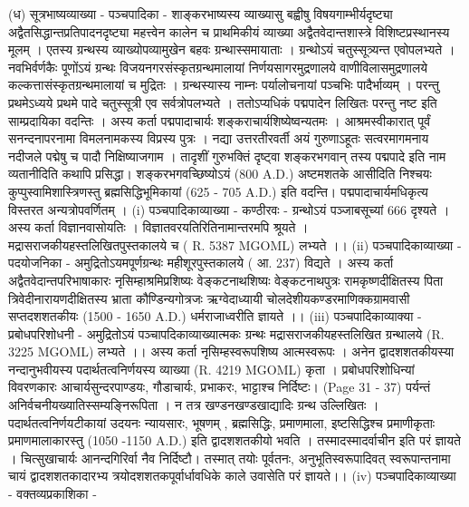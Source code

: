  (ध) सूत्रभाष्यव्याख्या - पञ्चपादिका - 
 शाङ्करभाष्यस्य व्याख्यासु बह्वीषु विषयगाम्भीर्यदृष्ट्या अद्वैतसिद्धान्तप्रतिपादनदृष्ट्या महत्त्वेन कालेन च प्राथमिकीयं व्याख्या अद्वैतवेदान्तशास्त्रे विशिष्टप्रस्थानस्य मूलम् । एतस्य ग्रन्थस्य व्याख्योपव्यामुखेन बहवः ग्रन्थास्समायाताः । ग्रन्थोऽयं चतुस्सूत्र्यन्त एवोपलभ्यते । नवभिर्वर्णकैः पूणोंऽयं ग्रन्थः विजयनगरसंस्कृतग्रन्थमालायां निर्णयसागरमुद्रणालये वाणीविलासमुद्रणालये कल्कत्तासंस्कृतग्रन्थमालायां च मुद्रितः । ग्रन्थस्यास्य नाम्नः पर्यालोचनायां पञ्चभिः पादैर्भाव्यम् । परन्तु प्रथमेऽध्यये प्रथमे पादे चतुस्सूत्री एव सर्वत्रोपलभ्यते । ततोऽप्यधिकं पद्मपादेन लिखितः परन्तु नष्ट इति साम्प्रदायिका वदन्तिः । 
अस्य कर्ता पद्मपादाचार्यः शङ्कराचार्यशिष्येष्वन्यतमः । आश्रमस्वीकारात् पूर्वं सनन्दनापरनामा विमलनामकस्य विप्रस्य पुत्रः । नद्या उत्तरतीरवर्ती अयं गुरुणाऽहूतः सत्वरमागमनाय नदीजले पद्मेषु च पादौ निक्षिष्याजगाम । तादृशीं गुरुभक्तिं दृष्ट्वा शङ्करभगवान् तस्य पद्मपादे इति नाम व्यतानीदिति कथापि प्रसिद्धा। शङ्करभगवच्छिष्योऽयं (800 A.D.) अष्टमशतके आसीदिति निश्चयः कुप्पुस्वामिशास्त्रिणस्तु ब्रह्मसिद्धिभूमिकायां (625 - 705 A.D.) इति वदन्ति। पद्मपादाचार्यमधिकृत्य विस्तरत अन्यत्रोपवर्णितम् ।
(i) पञ्चपादिकाव्याख्या - कण्ठीरवः -
ग्रन्थोऽयं पञ्जाबसूच्यां 666 दृश्यते । अस्य कर्ता विज्ञानवासोयतिः । विज्ञातवरयतिरितिनामान्तरमपि श्रूयते । मद्रासराजकीयहस्तलिखितपुस्तकालये च ( R. 5387 MGOML) लभ्यते ।। 
(ii) पञ्चपादिकाव्याख्या - पदयोजनिका - 
अमुद्रितोऽयमपूर्णग्रन्थः महीशूरपुस्तकालये ( आ. 237) विद्यते । अस्य कर्ता अद्वैतवेदान्तपरिभाषाकारः नृसिम्हाश्रमिप्रशिष्यः वेङ्कटनाथशिष्यः वेङ्कटनाथपुत्रः रामकृष्णदीक्षितस्य पिता त्रिवेदीनारायणदीक्षितस्य भ्राता कौण्डिन्यगोत्रजः ऋग्वेदाध्यायी चोलदेशीयकण्डरमाणिक्कग्रामवासी सप्तदशशतकीयः (1500 - 1650 A.D.) धर्मराजाध्वरीति ज्ञायते ।। 
(iii) पञ्चपादिकाव्याक्या - प्रबोधपरिशोधनी -
अमुद्रितोऽयं पञ्चापदिकाव्याख्यात्मकः ग्रन्थः मद्रासराजकीयहस्तलिखित ग्रन्थालये (R. 3225 MGOML) लभ्यते ।। 
अस्य कर्ता नृसिम्हस्वरूपशिष्य आत्मस्वरूपः । अनेन द्वादशशतकीयस्या नन्दानुभवीयस्य पदार्थतत्वनिर्णयस्य व्याख्या (R. 4219 MGOML) कृता । प्रबोधपरिशोधिन्यां विवरणकारः आचार्यसुन्दरपाण्डयः, गौडाचार्यः, प्रभाकरः, भाट्टाश्च निर्दिष्टः। (Page 31 - 37) पर्यन्तं अनिर्वचनीयख्यातिस्सम्यङ्निरूपिता । न तत्र खण्डनखण्डखाद्यादिः ग्रन्थ उल्लिखितः । पदार्थतत्वनिर्णयटीकायां उदयनः न्यायसारः, भूषणम् , ब्रह्मसिद्धिः, प्रमाणमाला, इष्टसिद्धिश्च प्रमाणीकृताः प्रमाणमालाकारस्तु (1050 -1150 A.D.) इति द्वादशशतकीयो भवति । तस्मादस्मादर्वाचीन इति परं ज्ञायते । चित्सुखाचार्यः आनन्दगिरिर्वा नैव निर्दिष्टौ। तस्मात्  तयोः पूर्वतनः, अनुभूतिस्वरूपादिवत् स्वरूपान्तनामा चायं द्वादशशतकादारभ्य त्रयोदशशतकपूर्वार्धावधिके काले उवासेति परं ज्ञायते।।
(iv)  पञ्चपादिकाव्याख्या - वक्तव्यप्रकाशिका -
